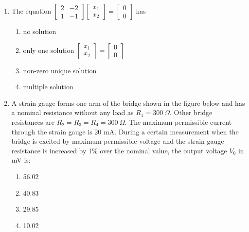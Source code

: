 \documentclass[journal,9pt,onecolumn]{IEEEtran}
\begin{document}
\begin{enumerate}
\begin{multicols}{4}
    \begin{enumerate}
        \item $-2.33$
        \item $0$
        \item $2.33$
        \item $7$
    \end{enumerate}
\end{multicols}


    
\item The equation $\begin{bmatrix}
    2&-2\\1&-1
\end{bmatrix}\begin{bmatrix}
    x_1\\x_2
\end{bmatrix} = \begin{bmatrix}
    0\\0
\end{bmatrix}$ has
\begin{multicols}{2}
\begin{enumerate}
    \item no solution
    \item only one solution $\begin{bmatrix}
        x_1\\x_2
    \end{bmatrix} = \begin{bmatrix}
        0\\0
    \end{bmatrix}$
    \item non-zero unique solution
    \item multiple solution
\end{enumerate}
\end{multicols}

\item A strain gauge forms one arm of the bridge shown in the figure below and has a nominal resistance without any load as $R_1 = 300 \ \Omega$. Other bridge resistances are $R_2 = R_3 = R_4 = 300 \ \Omega$. The maximum permissible current through the strain gauge is 20 mA. During a certain measurement when the bridge is excited by maximum permissible voltage and the strain gauge resistance is increased by 1\% over the nominal value, the output voltage $V_0$ in mV is:
\begin{center}
    
\end{center}
\begin{multicols}{4}
\begin{enumerate}
    \item 56.02
    \item 40.83
    \item 29.85
    \item 10.02
\end{enumerate}
\end{multicols}


\end{enumerate}
\end{document}
